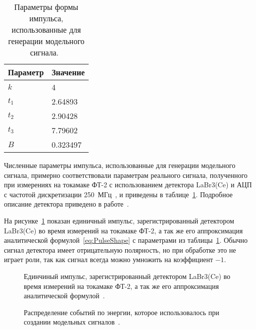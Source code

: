 \begin{table} [htbp]
    \centering
    \begin{threeparttable}
        \caption{Параметры формы импульса, использованные для генерации модельного сигнала.~\cite{Khilkevitch2020}}
        \label{tab:PulseShapeFt2}
        \begin{tabular}{| p{3cm} | p{3cm} |}
            \hline
            Параметр   & Значение \\
            \hline
            $k$ & 4  \\
            $t_1$ & 2.64893 \\
            $t_2$ & 2.90428 \\
            $t_3$ & 7.79602 \\
            $B$ & 0.323497 \\
            \hline
        \end{tabular}
    \end{threeparttable}
\end{table}

Численные параметры импульса, использованные для генерации модельного сигнала, примерно соответствовали параметрам реального сигнала, полученного при измерениях на токамаке ФТ-2 с использованием детектора LaBr3(Ce) и АЦП с частотой дискретизации 250~МГц~\cite{Shevelev2017}, и приведены в таблице~\ref{tab:PulseShapeFt2}. Подробное описание детектора приведено в работе~\cite{Shevelev2017}. 

На рисунке~\ref{fig:pulseShapeFt2} показан единичный импульс, зарегистрированный детектором LaBr3(Ce) во время измерений на токамаке ФТ-2, а так же его аппроксимация аналитической формулой~\ref{eq:PulseShape} с параметрами из таблицы~\ref{tab:PulseShapeFt2}. Обычно сигнал детектора имеет отрицательную полярность, но при обработке это не играет роли, так как сигнал всегда можно умножить на коэффициент $-1$. 

\begin{figure}[ht!]
  \caption{ Единчиный импульс, зарегистрированный детектором LaBr3(Ce) во время измерений на токамаке ФТ-2, а так же его аппроксимация аналитической формулой~\cite{Khilkevitch2020}.}
  \label{fig:pulseShapeFt2}
\end{figure}

\begin{figure}[ht!]
  \caption{ Распределение событий по энергии, которое использовалось при создании модельных сигналов~\cite{Khilkevitch2020}.}
  \label{fig:testModelSpectrum}
\end{figure}

